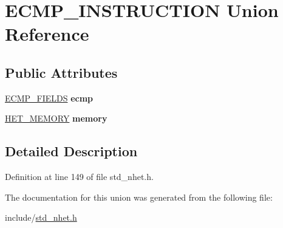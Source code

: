 \hypertarget{unionECMP__INSTRUCTION}{}\section{E\+C\+M\+P\+\_\+\+I\+N\+S\+T\+R\+U\+C\+T\+I\+ON Union Reference}
\label{unionECMP__INSTRUCTION}
\subsection*{Public Attributes}
\begin{DoxyCompactItemize}
\item 
\mbox{\label{unionECMP__INSTRUCTION_a112817a8eb19ea0e525ae4e36a8e7157}} 
\mbox{\hyperlink{structecmp__format}{E\+C\+M\+P\+\_\+\+F\+I\+E\+L\+DS}} {\bfseries ecmp}
\item 
\mbox{\label{unionECMP__INSTRUCTION_a4dbffe9f8a710e439591344f3eb57459}} 
\mbox{\hyperlink{structmemory__format}{H\+E\+T\+\_\+\+M\+E\+M\+O\+RY}} {\bfseries memory}
\end{DoxyCompactItemize}


\subsection{Detailed Description}


Definition at line 149 of file std\+\_\+nhet.\+h.



The documentation for this union was generated from the following file\+:\begin{DoxyCompactItemize}
\item 
include/\mbox{\hyperlink{std__nhet_8h}{std\+\_\+nhet.\+h}}\end{DoxyCompactItemize}
